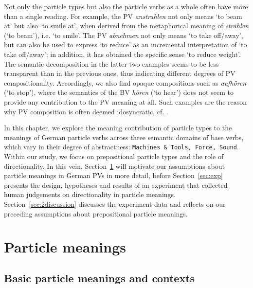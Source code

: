 \documentclass[output=paper]{langsci/langscibook}
\begin{document}
Not only the particle types but also the particle verbs as a whole
often have more than a single reading. For example, the PV
\textit{anstrahlen} not only means `to beam at' but also `to smile
at', when derived from the metaphorical meaning of \textit{strahlen}
(`to beam'), i.e. `to smile'. The PV \textit{abnehmen} not only means
`to take off/away', but can also be used to express `to reduce' as an
incremental interpretation of `to take off/away'; in addition, it has
obtained the specific sense `to reduce weight'. The semantic
decomposition in the latter two examples seems to be less transparent
than in the previous ones, thus indicating different degrees of PV
compositionality. Accordingly, we also find opaque compositions such
as \textit{aufhören} (`to stop'), where the semantics of the BV
\textit{hören} (`to hear') does not seem to provide any contribution
to the PV meaning at all. Such examples are the reason why PV
composition is often deemed idosyncratic, cf. \cite{Kratzer:03}.

In this chapter, we explore the meaning contribution of particle types
to the meanings of German particle verbs across three semantic domains
of base verbs, which vary in their degree of abstractness:
\texttt{Machines \& Tools, Force, Sound}. Within our study, we focus
on prepositional particle types and the role of directionality. In
this vein, Section~\ref{sec:p-meaning} will motivate our assumptions
about particle meanings in German PVs in more detail, before
Section~\ref{sec:exp} presents the design, hypotheses and results of
an experiment that collected human judgements on directionality in
particle meanings. Section~\ref{sec:2discussion} discusses the
experiment data and reflects on our preceding assumptions about
prepositional particle meanings.


\section{Particle meanings}
\label{sec:p-meaning}

\subsection{Basic particle meanings and contexts}
\end{document}
